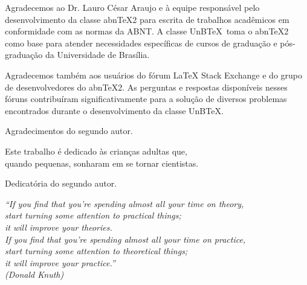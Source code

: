 \documentclass[
    oneside, %
    sumario=tradicional, %
    idioma=brazil, %
    bib=alf, %
    refback, %
    num=tradicional, %
    ]{unbtex}
\begin{document}


\begin{AgradecimentosAutorI}
Agradecemos ao Dr. Lauro César Araujo e à equipe responsável pelo desenvolvimento da classe abn\TeX2 para escrita de trabalhos acadêmicos em conformidade com as normas da ABNT. A classe UnB\TeX\ toma o abn\TeX2 como base para atender necessidades específicas de cursos de graduação e pós-graduação da Universidade de Brasília.

Agradecemos também aos usuários do fórum LaTeX Stack Exchange e do grupo de desenvolvedores do abn\TeX2. As perguntas e respostas disponíveis nesses fóruns contribuíram significativamente para a solução de diversos problemas encontrados durante o desenvolvimento da classe UnB\TeX.
\end{AgradecimentosAutorI}

\begin{AgradecimentosAutorII}
Agradecimentos do segundo autor.
\end{AgradecimentosAutorII}

\begin{DedicatoriaAutorI}
Este trabalho é dedicado às crianças adultas que,\\
quando pequenas, sonharam em se tornar cientistas.
\end{DedicatoriaAutorI}

\begin{DedicatoriaAutorII}
Dedicatória do segundo autor.
\end{DedicatoriaAutorII}

\begin{Epigrafe}
\vspace*{\fill}
\begin{flushright}
    \textit{``If you find that you're spending almost all your time on theory,\\
    start turning some attention to practical things;\\
    it will improve your theories.\\
    If you find that you're spending almost all your time on practice,\\
    start turning some attention to theoretical things;\\
    it will improve your practice.''\\
    (Donald Knuth)}
\end{flushright}
\end{Epigrafe}
\end{document}
